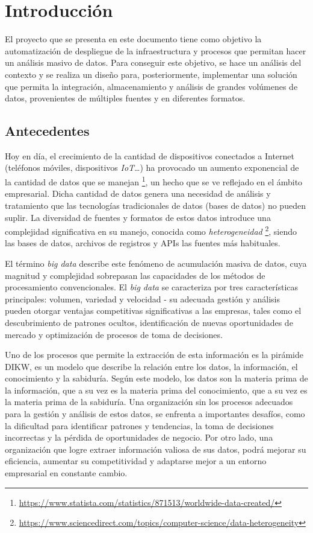 \chapter{Introducción}\label{chap:intro}
El proyecto que se presenta en este documento tiene como objetivo la
automatización de despliegue de la infraestructura y procesos que permitan hacer
un análisis masivo de datos. Para conseguir este objetivo, se hace un
análisis del contexto y se realiza un diseño para, posteriormente, implementar
una solución que permita la integración, almacenamiento y análisis de grandes
volúmenes de datos, provenientes de múltiples fuentes y en diferentes formatos.


\section{Antecedentes}\label{sec:antecedentes}
Hoy en día, el crecimiento de la cantidad de dispositivos conectados a Internet
(teléfonos móviles, dispositivos \textit{IoT}\ldots) ha provocado un aumento
exponencial de la cantidad de datos que se manejan \footnote{
	\url{https://www.statista.com/statistics/871513/worldwide-data-created/}
}, un hecho que se ve reflejado en el ámbito empresarial. Dicha cantidad de
datos genera una necesidad de análisis y tratamiento que las tecnologías
tradicionales de datos (bases de datos) no pueden suplir. La diversidad de
fuentes y formatos de estos datos introduce una complejidad significativa en su
manejo, conocida como \textit{heterogeneidad} \footnote{
	\url{https://www.sciencedirect.com/topics/computer-science/data-heterogeneity}
}, siendo las bases de datos, archivos de registros y APIs las fuentes más
habituales.

El término \textit{big data} describe este fenómeno de acumulación masiva de
datos, cuya magnitud y complejidad sobrepasan las capacidades de los métodos de
procesamiento convencionales. El \textit{big data} se caracteriza por tres
características principales: volumen, variedad y velocidad - su adecuada gestión
y análisis pueden otorgar ventajas competitivas significativas a las empresas,
tales como el descubrimiento de patrones ocultos, identificación de nuevas
oportunidades de mercado y optimización de procesos de toma de decisiones.

Uno de los procesos que permite la extracción de esta información es la pirámide
DIKW, \cite{enwiki:1211227190} es un modelo que describe la relación entre los
datos, la información, el conocimiento y la sabiduría. Según este modelo, los
datos son la materia prima de la información, que a su vez es la materia prima
del conocimiento, que a su vez es la materia prima de la sabiduría. Una
organización sin los procesos adecuados para la gestión y análisis de estos
datos, se enfrenta a importantes desafíos, como la dificultad para identificar
patrones y tendencias, la toma de decisiones incorrectas y la pérdida de
oportunidades de negocio. Por otro lado, una organización que logre extraer
información valiosa de sus datos, podrá mejorar su eficiencia, aumentar su
competitividad y adaptarse mejor a un entorno empresarial en constante cambio.

